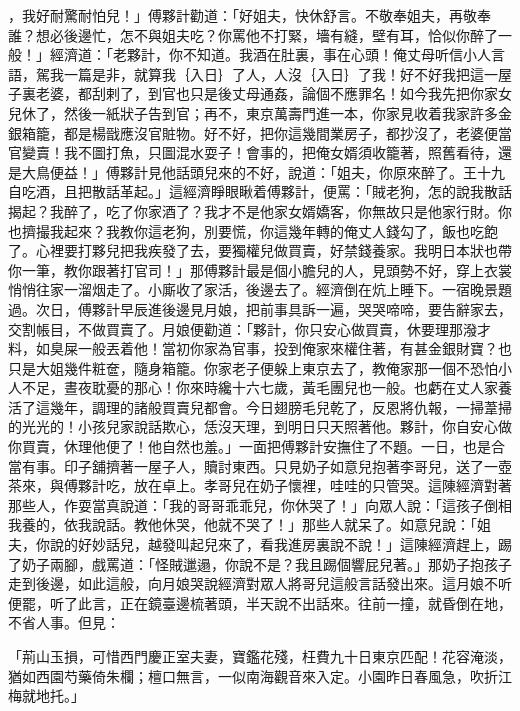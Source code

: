 \begin{showcontents}{}
，我好耐驚耐怕兒！」傅夥計勸道：「好姐夫，快休舒言。不敬奉姐夫，再敬奉誰？想必後邊忙，怎不與姐夫吃？你罵他不打緊，墻有縫，壁有耳，恰似你醉了一般！」經濟道：「老夥計，你不知道。我酒在肚裏，事在心頭！俺丈母听信小人言語，駕我一篇是非，就算我｛入日｝了人，人沒｛入日｝了我！好不好我把這一屋子裏老婆，都刮剌了，到官也只是後丈母通姦，論個不應罪名！如今我先把你家女兒休了，然後一紙狀子告到官；再不，東京萬壽門進一本，你家見收着我家許多金銀箱籠，都是楊戩應沒官賍物。好不好，把你這幾間業房子，都抄沒了，老婆便當官變賣！我不圖打魚，只圖混水耍子！會事的，把俺女婿須收籠著，照舊看待，還是大鳥便益！」傅夥計見他話頭兒來的不好，說道：「姐夫，你原來醉了。王十九自吃酒，且把散話革起。」這經濟睜眼瞅着傅夥計，便罵：「賊老狗，怎的說我散話揭起？我醉了，吃了你家酒了？我才不是他家女婿嬌客，你無故只是他家行財。你也擠撮我起來？我教你這老狗，別要慌，你這幾年轉的俺丈人錢勾了，飯也吃飽了。心裡要打夥兒把我疾發了去，要獨權兒做買賣，好禁錢養家。我明日本狀也帶你一筆，教你跟著打官司！」那傅夥計最是個小膽兒的人，見頭勢不好，穿上衣裳悄悄往家一溜烟走了。小廝收了家活，後邊去了。經濟倒在炕上睡下。一宿晚景題過。次日，傅夥計早辰進後邊見月娘，把前事具訴一遍，哭哭啼啼，要告辭家去，交割帳目，不做買賣了。月娘便勸道：「夥計，你只安心做買賣，休要理那潑才料，如臭屎一般丟着他！當初你家為官事，投到俺家來權住著，有甚金銀財寶？也只是大姐幾件粧奩，隨身箱籠。你家老子便躲上東京去了，教俺家那一個不恐怕小人不足，晝夜耽憂的那心！你來時纔十六七歲，黃毛團兒也一般。也虧在丈人家養活了這幾年，調理的諸般買賣兒都會。今日翅膀毛兒乾了，反恩將仇報，一掃葦掃的光光的！小孩兒家說話欺心，恁沒天理，到明日只天照著他。夥計，你自安心做你買賣，休理他便了！他自然也羞。」一面把傅夥計安撫住了不題。一日，也是合當有事。印子舖擠著一屋子人，贖討東西。只見奶子如意兒抱著李哥兒，送了一壺茶來，與傅夥計吃，放在卓上。孝哥兒在奶子懷裡，哇哇的只管哭。這陳經濟對著那些人，作耍當真說道：「我的哥哥乖乖兒，你休哭了！」向眾人說：「這孩子倒相我養的，依我說話。教他休哭，他就不哭了！」那些人就呆了。如意兒說：「姐夫，你說的好妙話兒，越發叫起兒來了，看我進房裏說不說！」這陳經濟趕上，踢了奶子兩腳，戲罵道：「怪賊邋遢，你說不是？我且踢個響屁兒著。」那奶子抱孩子走到後邊，如此這般，向月娘哭說經濟對眾人將哥兒這般言話發出來。這月娘不听便罷，听了此言，正在鏡臺邊梳著頭，半天說不出話來。往前一撞，就昏倒在地，不省人事。但見：

「荊山玉損，可惜西門慶正室夫妻，寶鑑花殘，枉費九十日東京匹配！花容淹淡，猶如西園芍藥倚朱欄；檀口無言，一似南海觀音來入定。小園昨日春風急，吹折江梅就地托。」


\end{showcontents}
